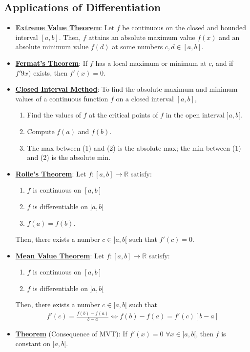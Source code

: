 \documentclass[reqno,11pt]{amsart}
\theoremstyle{definition}
\theoremstyle{remark}
\newcommand{\R}{\mathbb{R}}
\newcommand{\dfn}[1]{\underline{\textbf{#1}}}
\begin{document}
\subsection{Applications of Differentiation}
\begin{itemize}[noitemsep]
	\item \dfn{Extreme Value Theorem}: Let $f$ be continuous on the closed and bounded interval $[a,b]$. Then, $f$ attains an absolute maximum value $f(x)$ and an absolute minimum value $f(d)$ at some numbers $c, d \in [a,b]$.
	\item \dfn{Fermat's Theorem}: If $f$ has a local maximum or minimum at $c$, and if $f'9x)$ exists, then $f'(x) =0$. 
	\item \dfn{Closed Interval Method}: To find the absolute maximum and minimum values of a continuous function $f$ on a closed interval $[a,b]$, 
	\begin{enumerate}[noitemsep]
		\item Find the values of $f$ at the critical points of $f$ in the open interval $]a,b[$. 
		\item Compute $f(a)$ and $f(b)$. 
		\item The max between (1) and (2) is the absolute max; the min between (1) and (2) is the absolute min. 
	\end{enumerate}
	\item \dfn{Rolle's Theorem}: Let $f: [a,b] \rightarrow \R$ satisfy: 
	\begin{enumerate}[noitemsep]
		\item $f$ is continuous on $[a,b]$
		\item $f$ is differentiable on $]a,b[$
		\item $f(a) = f(b)$. 
	\end{enumerate}
	Then, there exists a number $c \in ]a,b[$ such that $f'(c) = 0$. 
	\item \dfn{Mean Value Theorem}: Let $f: [a,b] \rightarrow \R$ satisfy: 
	\begin{enumerate}[noitemsep]
		\item $f$ is continuous on $[a,b]$ 
		\item $f$ is differentiable on $]a,b[$
	\end{enumerate}
	Then, there exists a number $c \in ]a,b[$ such that
	\begin{align}
		f'(c) = \frac{f(b) - f(a)}{b-a} \iff f(b) -f(a) = f'(c) [b-a]	
	\end{align}
	\item \dfn{Theorem} (Consequence of MVT): If $f'(x) =0$ $\forall x \in ]a,b[$, then $f$ is constant on $]a,b[$. 

\end{itemize}
\end{document}
